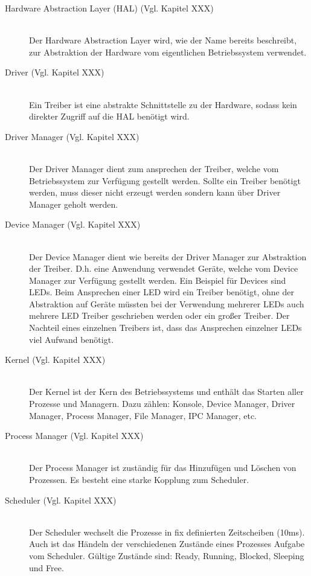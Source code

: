 \begin{description}
	\item[Hardware Abstraction Layer (HAL) (Vgl. Kapitel XXX)] \hfill \\
	Der Hardware Abstraction Layer wird, wie der Name bereits beschreibt, zur Abstraktion der Hardware vom eigentlichen Betriebssystem verwendet.
	
	\item[Driver (Vgl. Kapitel XXX)] \hfill \\
	Ein Treiber ist eine abstrakte Schnittstelle zu der Hardware, sodass kein direkter Zugriff auf die HAL benötigt wird.
	
	\item[Driver Manager (Vgl. Kapitel XXX)] \hfill \\
	Der Driver Manager dient zum ansprechen der Treiber, welche vom Betriebssystem zur Verfügung gestellt werden. Sollte ein Treiber benötigt werden, muss dieser nicht erzeugt werden sondern kann über Driver Manager geholt werden. 
	
	\item[Device Manager (Vgl. Kapitel XXX)] \hfill \\
	Der Device Manager dient wie bereits der Driver Manager zur Abstraktion der Treiber. D.h. eine Anwendung verwendet Geräte, welche vom Device Manager zur Verfügung gestellt werden. Ein Beispiel für Devices sind LEDs. Beim Ansprechen einer LED wird ein Treiber benötigt, ohne der Abstraktion auf Geräte müssten bei der Verwendung mehrerer LEDs auch mehrere LED Treiber geschrieben werden oder ein großer Treiber. Der Nachteil eines einzelnen Treibers ist, dass das Ansprechen einzelner LEDs viel Aufwand benötigt.
	
	\item[Kernel (Vgl. Kapitel XXX)] \hfill \\
	Der Kernel ist der Kern des Betriebssystems und enthält das Starten aller Prozesse und Managern. Dazu zählen: Konsole, Device Manager, Driver Manager, Process Manager, File Manager, IPC Manager, etc.
	
	\item[Process Manager (Vgl. Kapitel XXX)] \hfill \\
	Der Process Manager ist zuständig für das Hinzufügen und Löschen von Prozessen. Es besteht eine starke Kopplung zum Scheduler.
	
	\item[Scheduler (Vgl. Kapitel XXX)] \hfill \\
	Der Scheduler wechselt die Prozesse in fix definierten Zeitscheiben (10ms). Auch ist das Händeln der verschiedenen Zustände eines Prozesses Aufgabe vom Scheduler. Gültige Zustände sind: Ready, Running, Blocked, Sleeping und Free.
	

\end{description}
